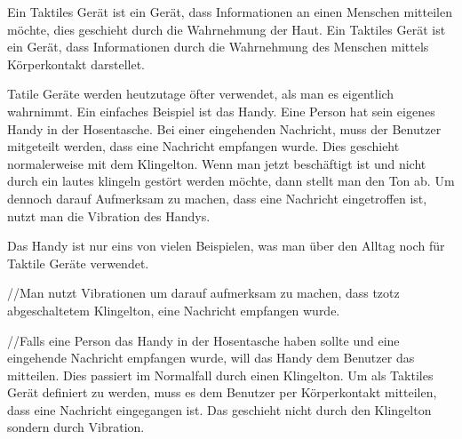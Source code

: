 
Ein Taktiles Gerät ist ein Gerät, dass Informationen an einen Menschen mitteilen möchte, dies geschieht durch die Wahrnehmung der Haut. 
Ein Taktiles Gerät ist ein Gerät, dass Informationen durch die Wahrnehmung des Menschen mittels Körperkontakt darstellet.  \cite{gemperle2001design}

Tatile Geräte werden heutzutage öfter verwendet, als man es eigentlich wahrnimmt. 
Ein einfaches Beispiel ist das Handy. 
Eine Person hat sein eigenes Handy in der Hosentasche. Bei einer eingehenden Nachricht, muss der Benutzer mitgeteilt werden, dass eine Nachricht empfangen wurde.
Dies geschieht normalerweise mit dem Klingelton. Wenn man jetzt beschäftigt ist und nicht durch ein lautes klingeln gestört werden möchte, dann stellt man den Ton ab. 
Um dennoch darauf Aufmerksam zu machen, dass eine Nachricht eingetroffen ist, nutzt man die Vibration des Handys.

Das Handy ist nur eins von vielen Beispielen, was man über den Alltag noch für Taktile Geräte verwendet.

//Man nutzt Vibrationen um darauf aufmerksam zu machen, dass tzotz abgeschaltetem Klingelton, eine Nachricht empfangen wurde. 

//Falls eine Person das Handy in der Hosentasche haben sollte und eine eingehende Nachricht empfangen wurde, will das Handy dem Benutzer das mitteilen.
Dies passiert im Normalfall durch einen Klingelton. Um als Taktiles Gerät definiert zu werden, muss es dem Benutzer per Körperkontakt mitteilen, dass eine Nachricht eingegangen ist. 
Das geschieht nicht durch den Klingelton sondern durch Vibration. 
